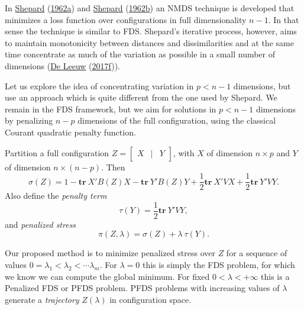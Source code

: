 \documentclass[
  12pt,
]{book}
\theoremstyle{definition}
\theoremstyle{definition}
\theoremstyle{definition}
\theoremstyle{definition}
\theoremstyle{remark}
\begin{document}
In \protect\hyperlink{ref-shepard_62a}{Shepard} (\protect\hyperlink{ref-shepard_62a}{1962a}) and \protect\hyperlink{ref-shepard_62b}{Shepard} (\protect\hyperlink{ref-shepard_62b}{1962b}) an NMDS technique is developed that minimizes a loss function over configurations in full dimensionality \(n-1\). In that sense the technique is similar to FDS. Shepard's iterative process, however, aims to maintain monotonicity between distances and dissimilarities and at the same time concentrate as much of the variation as possible in a small number of dimensions (\protect\hyperlink{ref-deleeuw_E_17e}{De Leeuw} (\protect\hyperlink{ref-deleeuw_E_17e}{2017f})).

Let us explore the idea of concentrating variation in \(p<n-1\) dimensions, but use an approach which is quite different from the one used by Shepard. We remain in the FDS framework, but we aim for solutions in \(p<n-1\) dimensions by penalizing \(n-p\) dimensions of the full configuration, using the classical Courant quadratic penalty function.

Partition a full configuration
\(Z=\begin{bmatrix}X&\mid&Y\end{bmatrix}\), with \(X\) of dimension \(n\times p\) and \(Y\) of dimension \(n\times(n-p)\). Then
\begin{equation}\label{E:part}   
\sigma(Z)=1-\mathbf{tr}\ X'B(Z)X - \mathbf{tr}\ Y'B(Z)Y+\frac12 \mathbf{tr}\ X'VX+\frac12 \mathbf{tr}\ Y'VY.
\end{equation}
Also define the \emph{penalty term}
\begin{equation}\label{E:tau}
\tau(Y)=\frac12\mathbf{tr}\ Y'VY,
\end{equation}
and \emph{penalized stress}
\begin{equation}\label{E:pi}
\pi(Z,\lambda)=\sigma(Z)+\lambda\ \tau(Y).
\end{equation}

Our proposed method is to minimize penalized stress over \(Z\) for a sequence of values \(0=\lambda_1<\lambda_2<\cdots\lambda_m\). For \(\lambda=0\) this is simply the FDS problem, for which we know we can compute the global minimum. For fixed \(0<\lambda<+\infty\) this is a Penalized FDS or PFDS problem. PFDS problems with increasing values of \(\lambda\) generate a \emph{trajectory} \(Z(\lambda)\) in configuration space.
\end{document}
